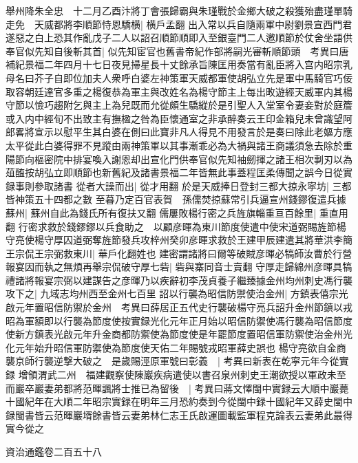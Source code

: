 舉州降朱全忠　十二月乙酉汴將丁會張歸霸與朱瑾戰於金鄉大破之殺獲殆盡瑾單騎走免　天威都將李順節恃恩驕横|{
	横戶孟翻}
出入常以兵自隨兩軍中尉劉景宣西門君遂惡之白上恐其作亂戊子二人以詔召順節順即入至銀臺門二人邀順節於仗舍坐語供奉官似先知自後斬其首|{
	似先知宦官也舊書帝紀作部將嗣光審斬順節頭　考異曰唐補紀景福二年四月十七日夜見掃星長十丈餘承旨陳匡用奏當有亂臣將入宫内昭宗乳母名曰芥子自即位加夫人衆呼白婆左神策軍天威都軍使胡弘立先是軍中馬騎官巧佞取容朝廷達官多重之楊復恭為軍主與改姓名為楊守節主上每出畋遊經天威軍内其楊守節以憸巧趨附乞與主上為兒既而允從頗生驕縱於是引聖人入堂室令妻妾對於庭簷或入内中經旬不出致主有撫楹之咎為臣懷通室之非承醉奏云王印金箱兒未曾識望阿郎畧將宣示以慰平生其白婆在側曰此寶非凡人得見不用發言於是奏曰除此老嫗方應太平從此白婆得罪不見蹤由兩神策軍以其事漸乖必為大禍與諸王商議須急去除於重陽節向樞密院中排宴喚入謝恩却出宣化門供奉官似先知袖劒揮之諸王相次剚刃以為葅醢按胡弘立即順節也新舊紀及諸書景福二年皆無此事蓋程匡柔傳聞之誤今日從實録事則參取諸書}
從者大譟而出|{
	從才用翻}
於是天威捧日登封三都大掠永寜坊|{
	三都皆神策五十四都之數}
至暮乃定百官表賀　孫儒焚掠蘇常引兵逼宣州錢鏐復遣兵據蘇州|{
	蘇州自此為錢氏所有復扶又翻}
儒屢敗楊行密之兵旌旗輜重亘百餘里|{
	重直用翻}
行密求救於錢鏐鏐以兵食助之　以顧彦暉為東川節度使遣中使宋道弼賜旌節楊守亮使楊守厚囚道弼奪旌節發兵攻梓州癸卯彦暉求救於王建甲辰建遣其將華洪李簡王宗侃王宗弼救東川|{
	華戶化翻姓也}
建密謂諸將曰爾等破賊彦暉必犒師汝曹於行營報宴因而執之無煩再舉宗侃破守厚七砦|{
	砦與寨同音士賣翻}
守厚走歸綿州彦暉具犒禮諸將報宴宗弼以建謀告之彦暉乃以疾辭初李茂貞養子繼臻據金州均州刺史馮行襲攻下之|{
	九域志均州西至金州七百里}
詔以行襲為昭信防禦使治金州|{
	方鎮表僖宗光啟元年置昭信防禦於金州　考異曰薛居正五代史行襲破楊守亮兵詔升金州節鎮以戎昭為軍額即以行襲為節度使按實録光化元年正月始以昭信防禦使馮行襲為昭信節度使新方鎮表光啟元年升金商都防禦使為節度使是年罷節度置昭信軍防禦使治金州光化元年始升昭信軍防禦使為節度使天佑二年賜號戎昭軍薛史誤也}
楊守亮欲自金商襲京師行襲逆撃大破之　是歲賜涇原軍號曰彰義　|{
	考異曰新表在乾寜元年今從實録}
增領渭武二州　福建觀察使陳巖疾病遣使以書召泉州刺史王潮欲授以軍政未至而巖卒巖妻弟都將范暉諷將士推已為留後　|{
	考異曰蔣文懌閩中實録云大順中巖薨十國紀年在大順二年昭宗實録在明年三月恐約奏到今從閩中録十國紀年又薛史閩中録閩書皆云范暉巖壻餘書皆云妻弟林仁志王氏啟運圖載監軍程克論表云妻弟此最得實今從之}


資治通鑑卷二百五十八
